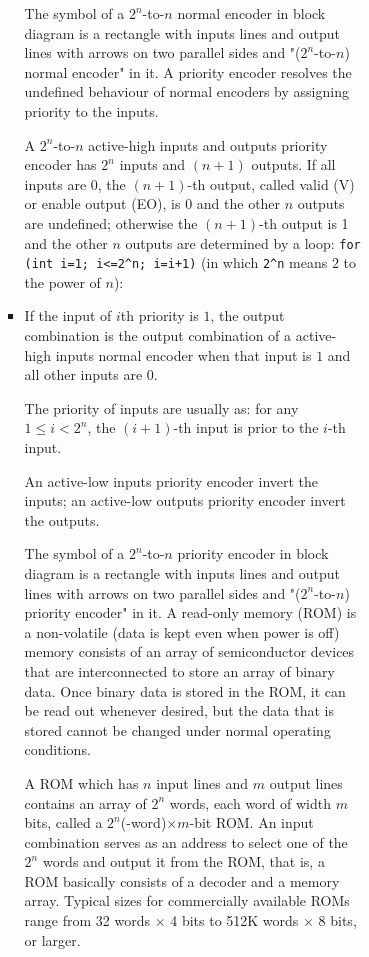 \documentclass[a4paper,12pt]{article}
\begin{document}
\begin{itemize}
\begin{itemize}
\begin{itemize}
\begin{itemize}
\begin{itemize}
\begin{itemize}
\begin{itemize}
The symbol of a $2^n$-to-$n$ normal encoder in block diagram is a rectangle with inputs lines and output lines with arrows on two parallel sides and "($2^n$-to-$n$) normal encoder" in it.
A priority encoder resolves the undefined behaviour of normal encoders by assigning priority to the inputs.

A $2^n$-to-$n$ active-high inputs and outputs priority encoder has $2^n$ inputs and $(n+1)$ outputs. If all inputs are 0, the $(n+1)$-th output, called valid (V) or enable output (EO), is 0 and the other $n$ outputs are undefined; otherwise the $(n+1)$-th output is 1 and the other $n$ outputs are determined by a loop: \texttt{for (int i=1; i<=2^n; i=i+1)} (in which \verb|2^n| means $2$ to the power of $n$):
\bit
\item If the input of $i$th priority is $1$, the output combination is the output combination of a active-high inputs normal encoder when that input is $1$ and all other inputs are $0$.
\eit

The priority of inputs are usually as: for any $1\leq i<2^n$, the $(i+1)$-th input is prior to the $i$-th input.

An active-low inputs priority encoder invert the inputs; an active-low outputs priority encoder invert the outputs.

The symbol of a $2^n$-to-$n$ priority encoder in block diagram is a rectangle with inputs lines and output lines with arrows on two parallel sides and "($2^n$-to-$n$) priority encoder" in it.
A read-only memory (ROM) is a non-volatile (data is kept even when power is off) memory consists of an array of semiconductor devices that are interconnected to store an array of binary data. Once binary data is stored in the ROM, it can be read out whenever desired, but the data that is stored cannot be changed under normal operating conditions.

A ROM which has $n$ input lines and $m$ output lines contains an array of $2^n$ words, each word of width $m$ bits, called a $2^n$(-word)$\times m$-bit ROM. An input combination serves as an address to select one of the $2^n$ words and output it from the ROM, that is, a ROM basically consists of a decoder and a memory array. Typical sizes for commercially available ROMs range from 32 words $\times$ 4 bits to 512K words $\times$ 8 bits, or larger.


\end{itemize}
\end{itemize}
\end{itemize}
\end{itemize}
\end{itemize}
\end{itemize}
\end{itemize}
\end{document}
